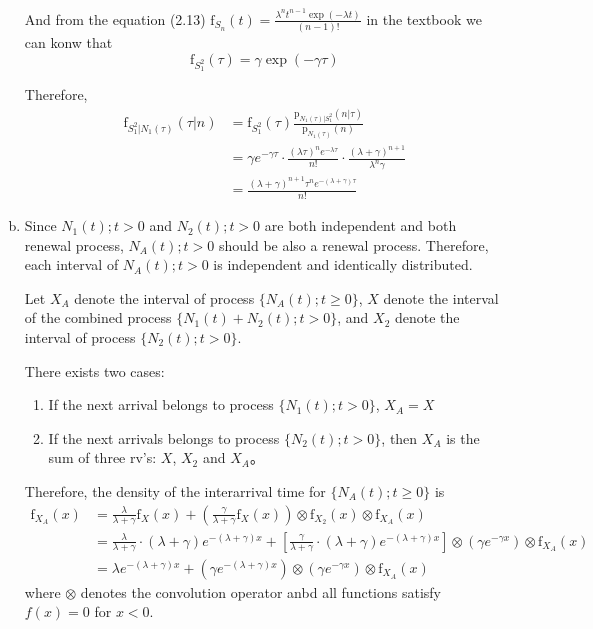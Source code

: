 \documentclass[UTF8]{article}
\begin{document}
\begin{enumerate}[a)]
        And from the equation (2.13) $\text{f}_{S_n}(t)=\frac{\lambda^n t^{n-1}\exp(-\lambda t)}{(n-1)!}$ in the textbook we can konw that
        \begin{equation*}
            \text{f}_{S^2_1}(\tau)=\gamma\exp(-\gamma\tau)
        \end{equation*}

        Therefore,
        \begin{equation*}
            \begin{aligned}
            \text{f}_{S^2_1|N_1(\tau)}(\tau|n)
            &=\text{f}_{S^2_1}(\tau)
            \frac{\text{p}_{N_1(\tau)|S^2_1}(n|\tau)}{\text{p}_{N_1(\tau)}(n)}\\
            &=\gamma e^{-\gamma\tau}\cdot\frac{(\lambda\tau)^n e^{-\lambda\tau}}{n!}\cdot\frac{(\lambda+\gamma)^{n+1}}{\lambda^n\gamma}\\
            &=\frac{(\lambda+\gamma)^{n+1}\tau^n e^{-(\lambda+\gamma)\tau}}{n!}
            \end{aligned}
        \end{equation*}
        \item 
        Since $N_1(t);t>0$ and $N_2(t);t>0$ are both independent and both renewal process, $N_A(t);t>0$ should be also a renewal process. Therefore, each interval of $N_A(t);t>0$ is independent and identically distributed.

        Let $X_A$ denote the interval of process $\{N_A(t);t\geq 0\}$, $X$ denote the interval of the combined process $\{N_1(t)+N_2(t);t>0\}$, and $X_2$ denote the interval of process $\{N_2(t);t>0\}$.

        There exists two cases:
        \begin{enumerate}[1.]
            \item If the next arrival belongs to process $\{N_1(t);t>0\}$, $X_A=X$
            \item If the next arrivals belongs to process $\{N_2(t);t>0\}$, then $X_A$ is the sum of three rv's: $X$, $X_2$ and $X_A$。
        \end{enumerate}

        Therefore, the density of the interarrival time for $\{N_A(t);t\geq 0\}$ is
        \begin{equation*}
            \begin{aligned}
                \text{f}_{X_A}(x)
                &=\frac{\lambda}{\lambda+\gamma}\text{f}_X(x)+(\frac{\gamma}{\lambda+\gamma}\text{f}_X(x))\otimes\text{f}_{X_2}(x)\otimes\text{f}_{X_A}(x)\\
                &=\frac{\lambda}{\lambda+\gamma}\cdot(\lambda+\gamma)e^{-(\lambda+\gamma)x}+[\frac{\gamma}{\lambda+\gamma}\cdot(\lambda+\gamma)e^{-(\lambda+\gamma)x}]\otimes(\gamma e^{-\gamma x})\otimes\text{f}_{X_A}(x)\\
                &=\lambda e^{-(\lambda+\gamma)x}+(\gamma e^{-(\lambda+\gamma)x})\otimes(\gamma e^{-\gamma x})\otimes\text{f}_{X_A}(x)
            \end{aligned}
        \end{equation*}
        where $\otimes$ denotes the convolution operator anbd all functions satisfy $f(x)=0$ for $x<0$.


\end{enumerate}
\end{document}
